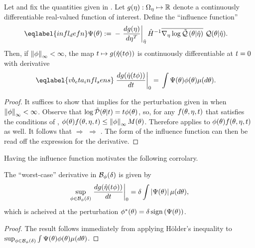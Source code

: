 \begin{cor}
%
Let  and fix the quantities given in
. Let $g(\eta): \Omega_{\eta} \mapsto \mathbb{R}$ denote a
continuously differentiable real-valued function of interest.  Define the
``influence function''
%
\begin{align}\eqlabel{infl_defn}
%
\infl(\theta) :={}&
    - \fracat{d g(\eta)}{ d \eta^T}{\etaopt} \hessopt^{-1}
        \lqgradbar{\theta \vert \etaopt}
        \q(\theta \vert \etaopt).
%
\end{align}
%
Then, if $\left\Vert\phi\right\Vert_{\infty} < \infty$, the map $t \mapsto g(\hat\eta(t \phi))$ is
continuously differentiable at $t=0$ with derivative
%
\begin{align}\eqlabel{vb_eta_infl_sens}
%
\fracat{d g(\etaopt(\t \phi))}{d \t}{0} ={}&
    \int \infl(\theta) \phi(\theta) \mu(d\theta).
%
\end{align}
%
\begin{proof}
%
It suffices to show that  implies
 for the perturbation given in 
when $\left\Vert\phi\right\Vert_{\infty} < \infty$.  Observe that $\log \tilde{\mathcal{P}}(\theta \vert t) = t
\phi(\theta)$, so, for any $f(\theta, \eta, t)$ that satisfies the conditions
of ,
%
%
$\phi(\theta) f(\theta, \eta, t) \le \left\Vert\phi\right\Vert_{\infty} M(\theta)$.
%
%
Therefore  applies to $\phi(\theta) f(\theta, \eta, t)$
as well.  It follows that  $\Rightarrow$
 $\Rightarrow$ . The form of
the influence function can then be read off the expression for the derivative.
%
\end{proof}
%
\end{cor}


Having the influence function motivates the following corrolary.



\begin{cor}
%
The ``worst-case'' derivative in $\mathcal{B}_\phi(\delta)$ is given by
%
\begin{align*}
%
\sup_{\phi \in \ball_\phi(\delta)}
    \fracat{d g(\etaopt(\t \phi))}{d \t}{0} =
        \delta \int \abs{\infl(\theta)} \mu(d\theta),
%
\end{align*}
%
which is acheived at the perturbation
$\phi^*(\theta) = \delta \, \mathrm{sign}\left(\Psi(\theta)\right)$.
%
\begin{proof}
%
The result follows immediately from applying H{\"o}lder's inequality
\citep[Theorem 5.1.2 and subsequent disscussion]{dudley:2018:real}to $\sup_{\phi
\in \mathcal{B}_\phi(\delta)} \int \Psi(\theta) \phi(\theta) \mu(d \theta)$.
%
\end{proof}
%
\end{cor}

